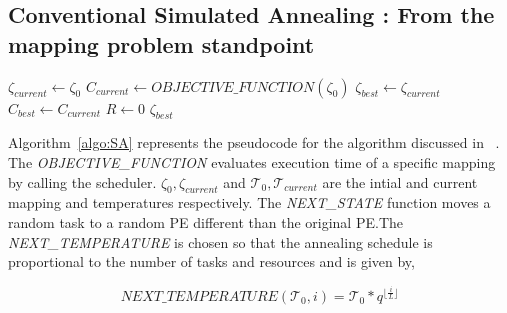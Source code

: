\subsection{Conventional Simulated Annealing : From the mapping problem standpoint}

\begin{algorithm}[h!]
  \small{
    \caption{$Simulated\_Annealing(\zeta_0, \mathcal{T}_0)$}
    \label{algo:SA}
    $\zeta_{current} \leftarrow \zeta_0$ \;
    $C_{current} \leftarrow OBJECTIVE\_FUNCTION(\zeta_0)$ \;
    $\zeta_{best} \leftarrow \zeta_{current}$\;
    $C_{best} \leftarrow C_{current}$\;
    $R \leftarrow 0$\;
    \Return $\zeta_{best}$
  }
\end{algorithm}

Algorithm~\ref{algo:SA} represents the pseudocode for the algorithm discussed in
~\cite{hors06}. The \textit{OBJECTIVE\_FUNCTION} evaluates execution time of a
specific mapping by calling the scheduler. $\zeta_0, \zeta_{current}$ and
$\mathcal{T}_0, \mathcal{T}_{current}$ are the intial and current mapping and
temperatures respectively. The \textit{NEXT\_STATE} function moves a random task
to a random PE different than the original PE.The \textit{NEXT\_TEMPERATURE} is
chosen so that the annealing schedule is proportional to the number of tasks and
resources and is given by,

\begin{equation}
\textit{NEXT\_TEMPERATURE}(\mathcal{T}_0, i) = \mathcal{T}_0*q^{\lfloor
\frac{i}{L} \rfloor}
\end{equation}


